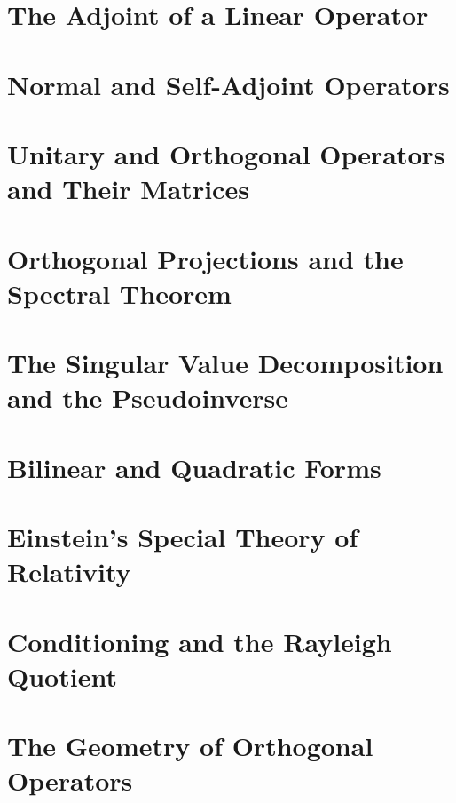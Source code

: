 \section{The Adjoint of a Linear Operator}


\section{Normal and Self-Adjoint Operators}


\section{Unitary and Orthogonal Operators and Their
Matrices}


\section{Orthogonal Projections and the Spectral Theorem}


\section{The Singular Value Decomposition and the
Pseudoinverse}


\section{Bilinear and Quadratic Forms}


\section{Einstein's Special Theory of Relativity}


\section{Conditioning and the Rayleigh Quotient}


\section{The Geometry of Orthogonal Operators}